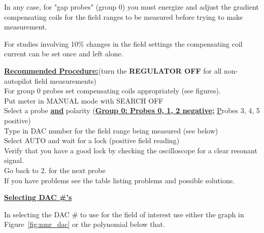 In any case, for "gap probes" (group 0) you must energize and adjust 
the gradient compensating coils for the field ranges to be measured before 
trying to make measurement.

For studies involving 
10\% changes in the field settings the compensating coil current can be 
set once and left alone.


\noindent\underline{\bf Recommended Procedure:}(turn the {\bf REGULATOR OFF} for all 
non-autopilot field measurements)\\
For group 0 probes set compensating coils appropriately (see figures).\\
Put meter in MANUAL mode with SEARCH OFF \\
Select a probe \underline{\bf and} polarity (\underline{\bf Group 0:  
Probes 0, 1, 2 negative;} {\underline Probes 3, 4, 5 positive}) \\
Type in DAC number for the field range being measured (see below) \\
Select AUTO and wait for a lock (positive field reading) \\
Verify that you have a good lock by checking the oscilloscope for a 
clear resonant signal. \\
Go back to 2. for the next probe \\
If you have problems see the table listing problems and possible 
solutions.

\noindent\underline{\bf Selecting DAC \#'s}

In selecting the DAC \# to use for the field of interest use 
either the graph in Figure~\ref{fig:nmr_dac} or the polynomial below that.

\pagebreak
{}\\

